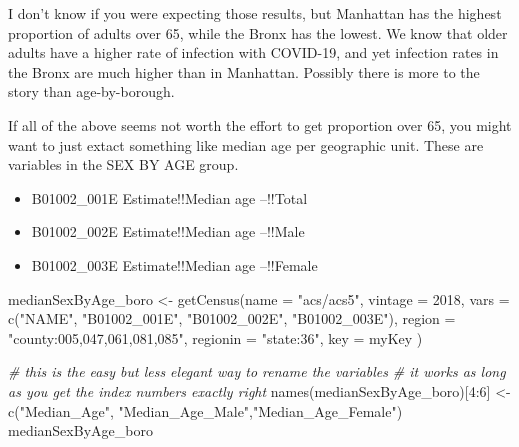 \documentclass[
  openany]{book}
\newenvironment{Shaded}{\begin{snugshade}}{\end{snugshade}}
\newcommand{\AttributeTok}[1]{\textcolor[rgb]{0.77,0.63,0.00}{#1}}
\newcommand{\CommentTok}[1]{\textcolor[rgb]{0.56,0.35,0.01}{\textit{#1}}}
\newcommand{\DecValTok}[1]{\textcolor[rgb]{0.00,0.00,0.81}{#1}}
\newcommand{\FunctionTok}[1]{\textcolor[rgb]{0.00,0.00,0.00}{#1}}
\newcommand{\NormalTok}[1]{#1}
\newcommand{\OtherTok}[1]{\textcolor[rgb]{0.56,0.35,0.01}{#1}}
\newcommand{\SpecialCharTok}[1]{\textcolor[rgb]{0.00,0.00,0.00}{#1}}
\newcommand{\StringTok}[1]{\textcolor[rgb]{0.31,0.60,0.02}{#1}}
\providecommand{\tightlist}{%
  \setlength{\itemsep}{0pt}\setlength{\parskip}{0pt}}
\begin{document}
I don't know if you were expecting those results, but Manhattan has the highest proportion of adults over 65, while the Bronx has the lowest. We know that older adults have a higher rate of infection with COVID-19, and yet infection rates in the Bronx are much higher than in Manhattan. Possibly there is more to the story than age-by-borough.

If all of the above seems not worth the effort to get proportion over 65, you might want to just extact something like median age per geographic unit. These are variables in the SEX BY AGE group.

\begin{itemize}
\tightlist
\item
  B01002\_001E Estimate!!Median age --!!Total
\item
  B01002\_002E Estimate!!Median age --!!Male
\item
  B01002\_003E Estimate!!Median age --!!Female
\end{itemize}

\begin{Shaded}
\begin{Highlighting}[]
\NormalTok{medianSexByAge\_boro }\OtherTok{\textless{}{-}} \FunctionTok{getCensus}\NormalTok{(}\AttributeTok{name =} \StringTok{"acs/acs5"}\NormalTok{,}
                                 \AttributeTok{vintage =} \DecValTok{2018}\NormalTok{,}
                                 \AttributeTok{vars =} \FunctionTok{c}\NormalTok{(}\StringTok{"NAME"}\NormalTok{, }
                                          \StringTok{"B01002\_001E"}\NormalTok{, }\StringTok{"B01002\_002E"}\NormalTok{, }\StringTok{"B01002\_003E"}\NormalTok{),}
                                 \AttributeTok{region =} \StringTok{"county:005,047,061,081,085"}\NormalTok{,}
                                 \AttributeTok{regionin =} \StringTok{"state:36"}\NormalTok{, }
                                 \AttributeTok{key =}\NormalTok{ myKey}
\NormalTok{                                 )}

\CommentTok{\# this is the easy but less elegant way to rename the variables}
\CommentTok{\# it works as long as you get the index numbers exactly right}
\FunctionTok{names}\NormalTok{(medianSexByAge\_boro)[}\DecValTok{4}\SpecialCharTok{:}\DecValTok{6}\NormalTok{] }\OtherTok{\textless{}{-}} \FunctionTok{c}\NormalTok{(}\StringTok{"Median\_Age"}\NormalTok{, }\StringTok{"Median\_Age\_Male"}\NormalTok{,}\StringTok{"Median\_Age\_Female"}\NormalTok{)}
\NormalTok{medianSexByAge\_boro}
\end{Highlighting}
\end{Shaded}
\end{document}
